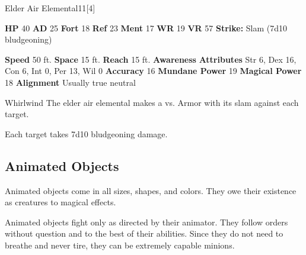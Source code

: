   \begin{monsubsection}{Elder Air Elemental}{11}[4]
    \vspace{-1em}\vspace{-1em}
    \vspace{0em}

    
    

    \begin{spellcontent}
      \begin{spelltargetinginfo}
        \pari \textbf{HP} 40 \monsep
          \textbf{AD} 25 \monsep
          \textbf{Fort} 18 \monsep
          \textbf{Ref} 23 \monsep
          \textbf{Ment} 17
        \pari \textbf{WR} 19 \monsep
        \textbf{VR} 57
        \pari \textbf{Strike:}
            Slam  (7d10 bludgeoning)
      \end{spelltargetinginfo}
    \end{spellcontent}
    \begin{monsterfooter}
      \pari \textbf{Speed} 50 ft. \monsep
        \textbf{Space} 15 ft. \monsep
        \textbf{Reach} 15 ft.
      \pari \textbf{Awareness} 
      \pari \textbf{Attributes}
        Str 6, Dex 16,
        Con 6, Int 0,
        Per 13, Wil 0
      \pari \textbf{Accuracy} 16 \monsep
        \textbf{Mundane Power} 19 \monsep
      \textbf{Magical Power} 18
      \pari \textbf{Alignment} Usually true neutral
    \end{monsterfooter}
  \end{monsubsection}
  \begin{freeability}{Whirlwind}
       The elder air elemental makes a 
         vs. Armor
        with its slam against each target.
    
    \hit Each target takes 7d10 bludgeoning damage.
    \end{freeability}
  
  
    \subsection{Animated Objects}
      
      Animated objects come in all sizes, shapes, and colors.
      They owe their existence as creatures to magical effects.
    
      Animated objects fight only as directed by their animator.
      They follow orders without question and to the best of their abilities.
      Since they do not need to breathe and never tire, they can be extremely capable minions.
    


